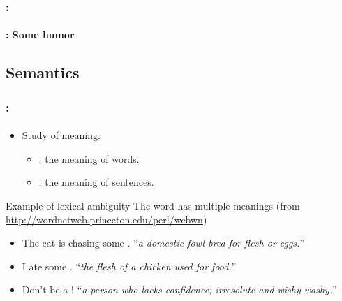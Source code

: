 \documentclass[xcolor=table]{beamer}
\begin{document}
\begin{frame}
	\frametitle{\insertshortsubtitle: \insertsection}
	\framesubtitle{\insertsubsection: Some humor}

	\begin{center}
	\end{center}

\end{frame}

\subsection{Semantics}

\begin{frame}
	\frametitle{\insertshortsubtitle: \insertsection}
	\framesubtitle{\insertsubsection}
	
	\begin{itemize}
		\item Study of meaning.
		\begin{itemize}
			\item {}: the meaning of words.
			\item {}: the meaning of sentences.
		\end{itemize}
	\end{itemize}
	
	\begin{exampleblock}{Example of lexical ambiguity}
		The word  has multiple meanings (from \url{http://wordnetweb.princeton.edu/perl/webwn})
		\begin{itemize}
			\item The cat is chasing some . ``\textit{a domestic fowl bred for flesh or eggs.}''
			\item I ate some . ``\textit{the flesh of a chicken used for food.}''
			\item Don't be a ! ``\textit{a person who lacks confidence; irresolute and wishy-washy.}''
		\end{itemize}
	\end{exampleblock}

\end{frame}
\end{document}

